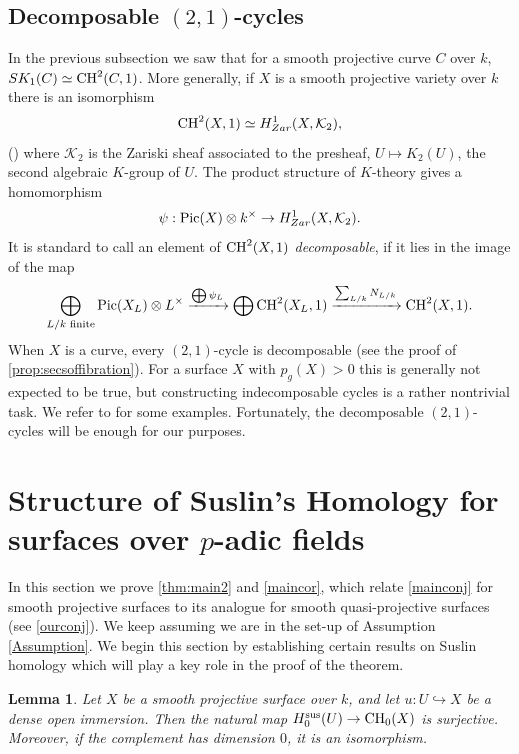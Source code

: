 \documentclass[12pt]{amsart}
\newtheorem{lem}[lem]{Lemma}
\theoremstyle{remark}
\renewcommand{\1}{{\mathbb{S}}}
\newcommand{\CH}{{\rm CH}}
\newcommand{\inj}{\hookrightarrow}
\newcommand{\Pic}{{\rm Pic}}
\newcommand{\<}{\langle}
\renewcommand{\>}{\rangle}
\newcommand{\Sus}{{\operatorname{sus}}}
\begin{document}
\subsection{Decomposable $(2,1)$-cycles} 
In the previous subsection we saw that for a smooth projective curve $C$ over $k$,  $SK_1(C)\simeq\CH^2(C,1)$. More generally, if $X$ is a smooth projective variety over $k$ there is an isomorphism 
\[\CH^2(X,1)\simeq H^1_{Zar}(X,\mathcal{K}_2),\] (\cite[Theorem 2.5]{Lan}) where $\mathcal{K}_2$ is the Zariski sheaf associated to the presheaf, $U\mapsto K_2(U)$, the second algebraic $K$-group of $U$.  The product structure of $K$-theory gives a homomorphism
\[\psi:\Pic(X)\otimes k^\times\to H^1_{Zar}(X,\mathcal{K}_2).\] 
It is standard to call an element of $\CH^2(X,1)$ \textit{decomposable}, if it lies in the image of the map
\[\bigoplus_{L/k \text{ finite}}\Pic(X_L)\otimes L^\times\xrightarrow{\bigoplus \psi_L} \bigoplus\CH^2(X_L,1)\xrightarrow{\sum_{L/k}N_{L/k}}\CH^2(X,1).\] 
When $X$ is a curve, every $(2,1)$-cycle is decomposable (see the proof of \autoref{prop:secsoffibration}). For a surface $X$ with $p_g(X)>0$ this is generally not expected to be true, but constructing indecomposable cycles is a rather nontrivial task. We refer to \cite{Mil,Sp} for some examples. Fortunately, the decomposable $(2,1)$-cycles will be enough for our purposes. 

\vspace{3pt}
 
\section{Structure of Suslin's Homology for surfaces over $p$-adic fields}\label{mainproofs}
In this section we prove \autoref{thm:main2} and \autoref{maincor}, which relate \autoref{mainconj} for smooth projective surfaces to its analogue for smooth quasi-projective surfaces (see \autoref{ourconj}).  We keep assuming we are in the set-up of Assumption \ref{Assumption}. We begin this section by establishing certain results on Suslin homology which will play a key role in the proof of the theorem. 


\begin{lem}\label{lem:Sus-hom-surjection}
Let $X$ be a smooth projective surface over $k$, and let 
$u \colon U \inj X$ be a dense open immersion. Then the natural map 
$H^{\mathrm{\Sus}}_{0}(U) \rightarrow \CH_{0}(X)$ is surjective. Moreover, if the complement has dimension $0$, it is an isomorphism.
\end{lem}
\end{document}
